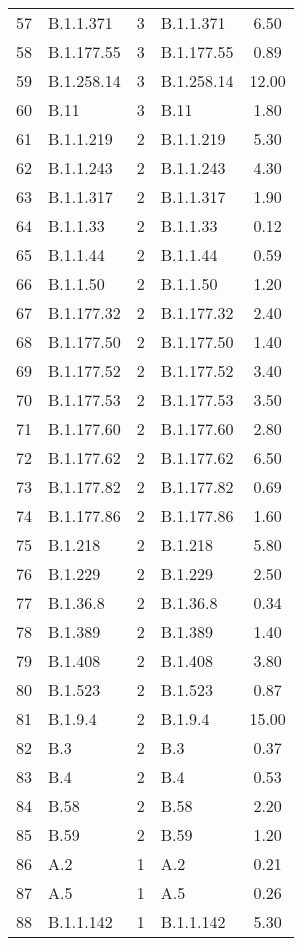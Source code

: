 \begin{longtable}{llcp{4cm}c}
  57 & B.1.1.371 &   3 & B.1.1.371 & 6.50 \\ 
  58 & B.1.177.55 &   3 & B.1.177.55 & 0.89 \\ 
  59 & B.1.258.14 &   3 & B.1.258.14 & 12.00 \\ 
  60 & B.11 &   3 & B.11 & 1.80 \\ 
  61 & B.1.1.219 &   2 & B.1.1.219 & 5.30 \\ 
  62 & B.1.1.243 &   2 & B.1.1.243 & 4.30 \\ 
  63 & B.1.1.317 &   2 & B.1.1.317 & 1.90 \\ 
  64 & B.1.1.33 &   2 & B.1.1.33 & 0.12 \\ 
  65 & B.1.1.44 &   2 & B.1.1.44 & 0.59 \\ 
  66 & B.1.1.50 &   2 & B.1.1.50 & 1.20 \\ 
  67 & B.1.177.32 &   2 & B.1.177.32 & 2.40 \\ 
  68 & B.1.177.50 &   2 & B.1.177.50 & 1.40 \\ 
  69 & B.1.177.52 &   2 & B.1.177.52 & 3.40 \\ 
  70 & B.1.177.53 &   2 & B.1.177.53 & 3.50 \\ 
  71 & B.1.177.60 &   2 & B.1.177.60 & 2.80 \\ 
  72 & B.1.177.62 &   2 & B.1.177.62 & 6.50 \\ 
  73 & B.1.177.82 &   2 & B.1.177.82 & 0.69 \\ 
  74 & B.1.177.86 &   2 & B.1.177.86 & 1.60 \\ 
  75 & B.1.218 &   2 & B.1.218 & 5.80 \\ 
  76 & B.1.229 &   2 & B.1.229 & 2.50 \\ 
  77 & B.1.36.8 &   2 & B.1.36.8 & 0.34 \\ 
  78 & B.1.389 &   2 & B.1.389 & 1.40 \\ 
  79 & B.1.408 &   2 & B.1.408 & 3.80 \\ 
  80 & B.1.523 &   2 & B.1.523 & 0.87 \\ 
  81 & B.1.9.4 &   2 & B.1.9.4 & 15.00 \\ 
  82 & B.3 &   2 & B.3 & 0.37 \\ 
  83 & B.4 &   2 & B.4 & 0.53 \\ 
  84 & B.58 &   2 & B.58 & 2.20 \\ 
  85 & B.59 &   2 & B.59 & 1.20 \\ 
  86 & A.2 &   1 & A.2 & 0.21 \\ 
  87 & A.5 &   1 & A.5 & 0.26 \\ 
  88 & B.1.1.142 &   1 & B.1.1.142 & 5.30 \\ 

\end{longtable}
